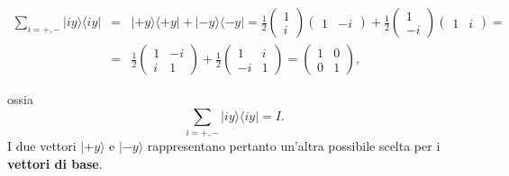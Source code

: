 \documentclass[a4paper,12pt,oneside]{book}
\begin{document}
	\begin{eqnarray}
		\sum _{i=+,-} |iy \rangle \langle iy | &=& | +y \rangle \langle +y | + |-y \rangle \langle -y | =   \frac{1}{2}
		\begin{pmatrix}
		1\\
		i
		\end{pmatrix}
		\begin{pmatrix}
		1 & -i
		\end{pmatrix}+
		\frac{1}{2}
		\begin{pmatrix}
		1\\
		-i
		\end{pmatrix}
		\begin{pmatrix}
		1 & i
		\end{pmatrix}= \nonumber \\
		&=& \frac{1}{2}
		\begin{pmatrix}
		1 & -i\\
		i & 1
		\end{pmatrix}+
		\frac{1}{2}
		\begin{pmatrix}
		1 & i\\
		-i & 1
		\end{pmatrix}=
		\begin{pmatrix}
		1 & 0\\
		0 & 1
		\end{pmatrix},
		\end{eqnarray}

ossia
	\begin{equation}
		\sum \limits_{i=+,-}  | iy \rangle \langle  iy  |=I .
	\end{equation}
I due vettori $| +y \rangle $ e $| -y \rangle $ rappresentano pertanto un'altra possibile scelta per i \textbf{vettori di base}.\\
\end{document}
